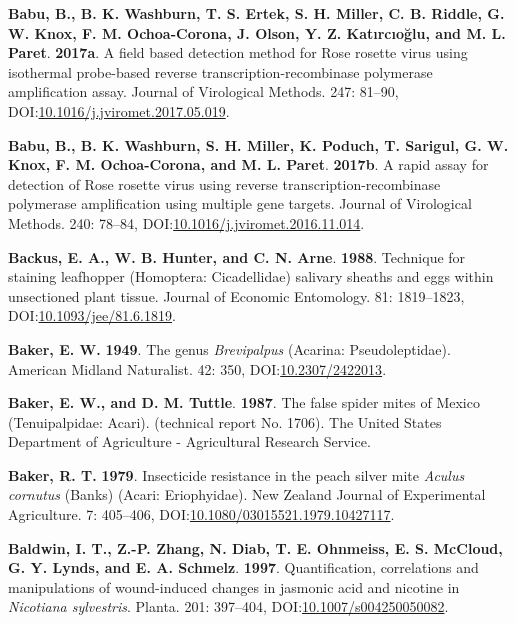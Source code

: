 \documentclass[12pt,final,CPage]{ufthesis}
\newlength{\cslhangindent}
\newenvironment{CSLReferences}[2] %
{%
	\setlength{\parindent}{0pt}
	\ifodd #1 \everypar{\setlength{\hangindent}{\cslhangindent}}\ignorespaces\fi
	\ifnum #2 > 0
	\setlength{\parskip}{#2\baselineskip}
	\fi
}%
{}
\begin{document}
{\begin{CSLReferences}{1}{0}
  \leavevmode{}%
  \textbf{Babu, B., B. K. Washburn, T. S. Ertek, S. H. Miller, C. B. Riddle, G. W. Knox, F. M. Ochoa-Corona, J. Olson, Y. Z. Katırcıoğlu, and M. L. Paret}. \textbf{2017a}. A field based detection method for {Rose rosette virus} using isothermal probe-based reverse transcription-recombinase polymerase amplification assay. Journal of Virological Methods. 247: 81--90, DOI:\href{https://doi.org/10.1016/j.jviromet.2017.05.019}{10.1016/j.jviromet.2017.05.019}.

  \leavevmode{}%
  \textbf{Babu, B., B. K. Washburn, S. H. Miller, K. Poduch, T. Sarigul, G. W. Knox, F. M. Ochoa-Corona, and M. L. Paret}. \textbf{2017b}. A rapid assay for detection of {Rose rosette virus} using reverse transcription-recombinase polymerase amplification using multiple gene targets. Journal of Virological Methods. 240: 78--84, DOI:\href{https://doi.org/10.1016/j.jviromet.2016.11.014}{10.1016/j.jviromet.2016.11.014}.

  \leavevmode{}%
  \textbf{Backus, E. A., W. B. Hunter, and C. N. Arne}. \textbf{1988}. Technique for staining leafhopper ({Homoptera}: {Cicadellidae}) salivary sheaths and eggs within unsectioned plant tissue. Journal of Economic Entomology. 81: 1819--1823, DOI:\href{https://doi.org/10.1093/jee/81.6.1819}{10.1093/jee/81.6.1819}.

  \leavevmode{}%
  \textbf{Baker, E. W.} \textbf{1949}. The genus {\emph{Brevipalpus}} ({Acarina}: {Pseudoleptidae}). American Midland Naturalist. 42: 350, DOI:\href{https://doi.org/10.2307/2422013}{10.2307/2422013}.

  \leavevmode{}%
  \textbf{Baker, E. W., and D. M. Tuttle}. \textbf{1987}. The false spider mites of {Mexico} ({Tenuipalpidae}: {Acari}). (technical report No. 1706). The {United States} Department of Agriculture - Agricultural Research Service.

  \leavevmode{}%
  \textbf{Baker, R. T.} \textbf{1979}. Insecticide resistance in the peach silver mite {\emph{Aculus cornutus}} {(Banks)} ({Acari}: {Eriophyidae}). New Zealand Journal of Experimental Agriculture. 7: 405--406, DOI:\href{https://doi.org/10.1080/03015521.1979.10427117}{10.1080/03015521.1979.10427117}.

  \leavevmode{}%
  \textbf{Baldwin, I. T., Z.-P. Zhang, N. Diab, T. E. Ohnmeiss, E. S. McCloud, G. Y. Lynds, and E. A. Schmelz}. \textbf{1997}. Quantification, correlations and manipulations of wound-induced changes in jasmonic acid and nicotine in {\emph{Nicotiana sylvestris}}. Planta. 201: 397--404, DOI:\href{https://doi.org/10.1007/s004250050082}{10.1007/s004250050082}.


\end{CSLReferences}}
\end{document}
